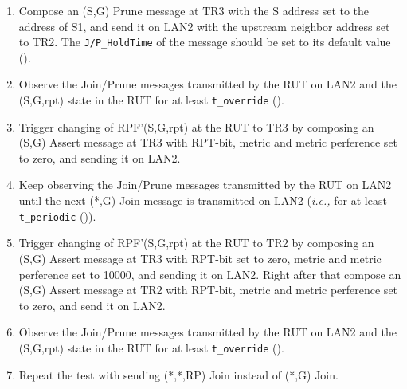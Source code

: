 \documentclass[11pt]{report}
\newcommand{\ie}{\emph{i.e.,}\xspace}
\begin{document}
\begin{enumerate}
  \item Compose an (S,G) Prune message at TR3 with the S address set to
  the address of S1, and send it on LAN2 with the upstream neighbor address
  set to TR2.
  The \verb=J/P_HoldTime= of the message should be set to its default
  value ({\PimsmJPHoldTime}).

  \item Observe the Join/Prune messages transmitted by the RUT on LAN2 and the
  (S,G,rpt) state in the RUT for at least \verb=t_override=
  ({\PimsmTOverride}).

  \item Trigger changing of RPF'(S,G,rpt) at the RUT to TR3 by composing an
  (S,G) Assert message at TR3 with RPT-bit, metric and metric 
  perference set to zero, and sending it on LAN2.

  \item Keep observing the Join/Prune messages transmitted by the
  RUT on LAN2 until the next (*,G) Join message is transmitted on
  LAN2 (\ie for at least \verb=t_periodic= ({\PimsmTPeriodic})).

  \item Trigger changing of RPF'(S,G,rpt) at the RUT to TR2 by composing an
  (S,G) Assert message at TR3 with RPT-bit set to zero, metric and metric 
  perference set to 10000, and sending it on LAN2. Right after that
  compose an (S,G) Assert message at TR2 with RPT-bit, metric and metric 
  perference set to zero, and send it on LAN2.

  \item Observe the Join/Prune messages transmitted by the RUT on LAN2 and the
  (S,G,rpt) state in the RUT for at least \verb=t_override=
  ({\PimsmTOverride}).

  \item Repeat the test with sending (*,*,RP) Join instead of (*,G)
  Join.

\end{enumerate}



\end{document}
